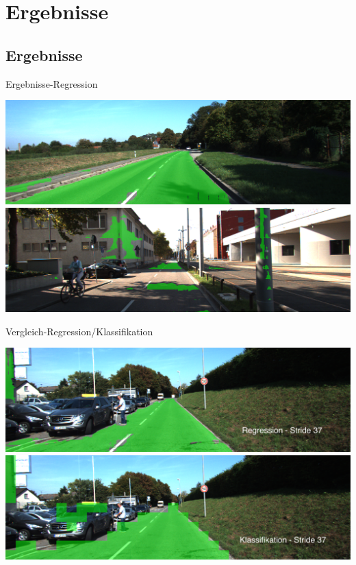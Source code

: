 \section{Ergebnisse}

\subsection{Ergebnisse}

\begin{frame}{Ergebnisse-Regression}
\begin{center}
    \includegraphics[scale=0.24]{../images/Convolutional/um_000014+-overlay-fully-49-patch.png}
    \vspace{0.1cm}
    \includegraphics[scale=0.24]{../images/Convolutional/um_000066-overlay-fully-49-patch.png}
        \end{center}
 \end{frame}

\begin{frame}{Vergleich-Regression/Klassifikation}
  \begin{center}
      \includegraphics[scale=0.24]{../images/Convolutional/um_000014-overlay-fully-49-patch.png}
         \vspace{0.1cm}
    \includegraphics[scale=0.24]{../images/Convolutional/testing-um_14_sliding_stride37.png}
    \end{center}
\end{frame}

